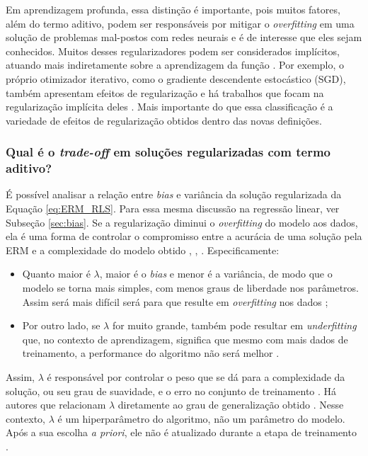 Em aprendizagem profunda, essa distinção é importante, pois muitos fatores, além do termo aditivo, podem ser responsáveis por mitigar o \textit{overfitting} em uma solução de problemas mal-postos com redes neurais e é de interesse que eles sejam conhecidos. Muitos desses regularizadores podem ser considerados implícitos, atuando mais indiretamente sobre a aprendizagem da função \cite[pág. 165]{Jakubovitz2019}. Por exemplo, o próprio otimizador iterativo, como o gradiente descendente estocástico (SGD), também apresentam efeitos de regularização \cite{2017kukacka} e há trabalhos que focam na regularização implícita deles \cite{Smith2021}. Mais importante do que essa classificação é a variedade de efeitos de regularização obtidos dentro das novas definições.





\subsubsection{Qual é o \textit{trade-off} em soluções regularizadas com termo aditivo?}

É possível analisar a relação entre \textit{bias} e variância da solução regularizada da Equação \eqref{eq:ERM_RLS}.  Para essa mesma discussão na regressão linear, ver Subseção \ref{sec:bias}. Se a regularização diminui o \textit{overfitting} do modelo aos dados, ela é uma forma de controlar o compromisso entre a acurácia de uma solução pela ERM e a complexidade do modelo obtido \cite[pág. 73-4]{cherkassky2007learning}, \cite[Seção 8.2.3]{Deisenroth2020}, \cite[pág. 188]{alvarez2017digital}. Especificamente:
\begin{itemize}
\item Quanto maior é $\lambda$, maior é o \textit{bias} e menor é a variância, de modo que o modelo se torna mais simples, com menos graus de liberdade nos parâmetros. Assim será mais difícil será para que resulte em \textit{overfitting} nos dados \cite{geron2019hands-on};
\item  Por outro lado, se $\lambda$ for muito grande, também pode resultar em \textit{underfitting} que, no contexto de aprendizagem, significa que mesmo com mais dados de treinamento, a performance do algoritmo não será melhor \cite{geron2019hands-on}.
\end{itemize}
Assim, $\lambda$ é responsável por controlar o peso que se dá para a complexidade da solução, ou seu grau de suavidade, e o erro no conjunto de treinamento \cite{Prato2008}. Há autores que relacionam $\lambda$ diretamente ao grau de generalização obtido \cite{Poggio1990}. Nesse contexto, $\lambda$ é um hiperparâmetro do algoritmo, não um parâmetro do modelo. Após a sua escolha \textit{a priori}, ele não é  atualizado durante a etapa de treinamento \cite{geron2019hands-on}. 


